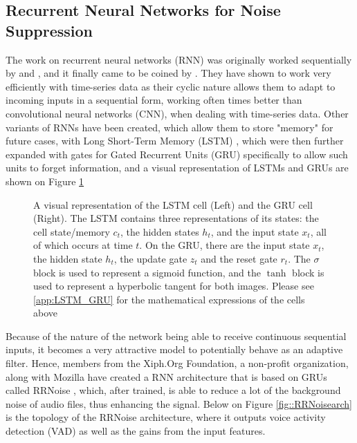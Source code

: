 \subsection{Recurrent Neural Networks for Noise Suppression}
The work on recurrent neural networks (RNN) was originally worked sequentially by \cite{rnn1} and \cite{rnn2}, and it finally came to be coined by \cite{rnn3}. They have shown to work very efficiently with time-series data as their cyclic nature allows them to adapt to incoming inputs in a sequential form, working often times better than convolutional neural networks (CNN), when dealing with time-series data. Other variants of RNNs have been created, which allow them to store "memory" for future cases, with Long Short-Term Memory (LSTM) \cite{lstm1}, which were then further expanded with gates for Gated Recurrent Units (GRU) \cite{gru1} specifically to allow such units to forget information, and a visual representation of LSTMs and GRUs are shown on Figure \ref{fig::LSTM_GRU}

\begin{figure}[H]
\begin{center}
    \caption{A visual representation of the LSTM cell (Left) and the GRU cell (Right). The LSTM contains three representations of its states: the cell state/memory $c_t$, the hidden states $h_t$, and the input state $x_t$, all of which occurs at time $t$. On the GRU, there are the input state $x_t$, the hidden state $h_t$, the update gate $z_t$ and the reset gate $r_t$. The $\sigma$ block is used to represent a sigmoid function, and the $\tanh$ block is used to represent a hyperbolic tangent for both images. Please see \ref{app:LSTM_GRU} for the mathematical expressions of the cells above}
    \label{fig::LSTM_GRU}
\end{center}
\end{figure}

Because of the nature of the network being able to receive continuous sequential inputs, it becomes a very attractive model to potentially behave as an adaptive filter. Hence, members from the Xiph.Org Foundation, a non-profit organization, along with Mozilla have created a RNN architecture that is based on GRUs called RRNoise \cite{rrnoise}, which, after trained, is able to reduce a lot of the background noise of audio files, thus enhancing the signal. Below on Figure \ref{fig::RRNoisearch} is the topology of the RRNoise architecture, where it outputs voice activity detection (VAD) as well as the gains from the input features.


